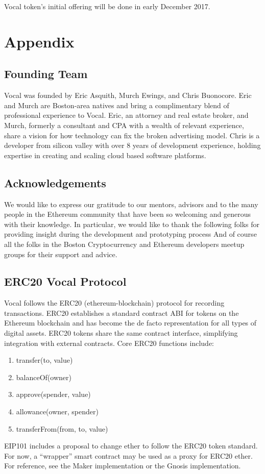 \documentclass[conference]{IEEEtran}
\begin{document}
    Vocal token's initial offering will be done in early December 2017.

    
    \section*{Appendix}

    \subsection{Founding Team}
    Vocal was founded by Eric Asquith, Murch Ewings, and Chris Buonocore.
     Eric and Murch are Boston-area natives and bring a complimentary blend of professional experience to Vocal. 
     Eric, an attorney and real estate broker, and Murch, formerly a consultant and CPA with a wealth of relevant experience, share a vision for how technology can fix the broken advertising model. 
     Chris is a developer from silicon valley with over 8 years of development experience, holding expertise in creating and scaling cloud based software platforms.  

    \subsection{Acknowledgements}

    We would like to express our gratitude to our mentors, advisors and to the many people in the Ethereum community that have been so welcoming and generous with their knowledge. 
    In particular, we would like to thank the following folks for providing insight during the development and prototyping process %
    And of course all the folks in the Boston Cryptocurrency and Ethereum developers meetup groups for their support and advice.

    \subsection{ERC20 Vocal Protocol}
    Vocal follows the ERC20 (ethereum-blockchain) protocol for recording transactions.
    ERC20 establishes a standard contract ABI for tokens on the Ethereum blockchain and has become the de facto representation for all types of digital assets. ERC20 tokens share the same contract interface, simplifying integration with external contracts.
    Core ERC20 functions include:
    \begin{enumerate}
    \item transfer(to, value)
    \item balanceOf(owner)
    \item approve(spender, value)
    \item allowance(owner, spender)
    \item transferFrom(from, to, value)
    \end{enumerate}
    EIP101 includes a proposal to change ether to follow the ERC20 token standard. For now, a “wrapper” smart contract may be used as a proxy for ERC20 ether. For reference, see the Maker implementation or the Gnosis implementation.
\end{document}
